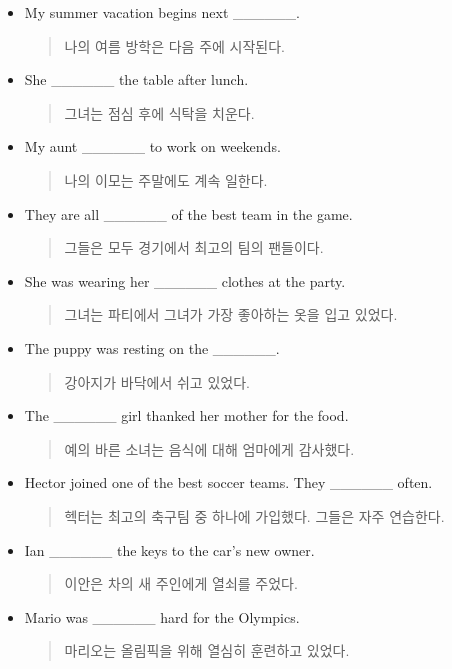 \documentclass{article}
\begin{document}
\begin{addmargin}[1em]{1em}
\begin{itemize}
    \item My summer vacation begins next \_\_\_\_\_\_.
    \begin{quote}
    나의 여름 방학은 다음 주에 시작된다.
    \end{quote}
    \newpage
    \item She \_\_\_\_\_\_ the table after lunch.
    \begin{quote}
    그녀는 점심 후에 식탁을 치운다.
    \end{quote}
    \item My aunt \_\_\_\_\_\_ to work on weekends.
    \begin{quote}
    나의 이모는 주말에도 계속 일한다.
    \end{quote}
    \item They are all \_\_\_\_\_\_ of the best team in the game.
    \begin{quote}
    그들은 모두 경기에서 최고의 팀의 팬들이다.
    \end{quote}
    \item She was wearing her \_\_\_\_\_\_ clothes at the party.
    \begin{quote}
    그녀는 파티에서 그녀가 가장 좋아하는 옷을 입고 있었다.
    \end{quote}
    \item The puppy was resting on the \_\_\_\_\_\_.
    \begin{quote}
    강아지가 바닥에서 쉬고 있었다.
    \end{quote}
    \item The \_\_\_\_\_\_ girl thanked her mother for the food.
    \begin{quote}
    예의 바른 소녀는 음식에 대해 엄마에게 감사했다.
    \end{quote}
    \item Hector joined one of the best soccer teams. They \_\_\_\_\_\_ often.
    \begin{quote}
    헥터는 최고의 축구팀 중 하나에 가입했다. 그들은 자주 연습한다.
    \end{quote}
    \item Ian \_\_\_\_\_\_ the keys to the car's new owner.
    \begin{quote}
    이안은 차의 새 주인에게 열쇠를 주었다.
    \end{quote}
    \item Mario was \_\_\_\_\_\_ hard for the Olympics.
    \begin{quote}
    마리오는 올림픽을 위해 열심히 훈련하고 있었다.
    \end{quote}

\end{itemize}
\end{addmargin}
\end{document}
